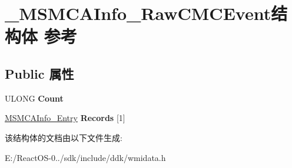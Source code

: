 \hypertarget{struct___m_s_m_c_a_info___raw_c_m_c_event}{}\section{\+\_\+\+M\+S\+M\+C\+A\+Info\+\_\+\+Raw\+C\+M\+C\+Event结构体 参考}
\label{struct___m_s_m_c_a_info___raw_c_m_c_event}
\subsection*{Public 属性}
\begin{DoxyCompactItemize}
\item 
\mbox{\label{struct___m_s_m_c_a_info___raw_c_m_c_event_af788249a98429fa9fd103b680202758f}} 
U\+L\+O\+NG {\bfseries Count}
\item 
\mbox{\label{struct___m_s_m_c_a_info___raw_c_m_c_event_a7b3487685944b08a1176af4e0774fd89}} 
\hyperlink{struct___m_s_m_c_a_info___entry}{M\+S\+M\+C\+A\+Info\+\_\+\+Entry} {\bfseries Records} \mbox{[}1\mbox{]}
\end{DoxyCompactItemize}


该结构体的文档由以下文件生成\+:\begin{DoxyCompactItemize}
\item 
E\+:/\+React\+O\+S-\/0../sdk/include/ddk/wmidata.\+h\end{DoxyCompactItemize}
